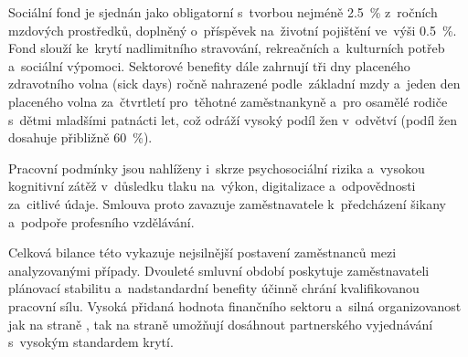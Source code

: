 Sociální fond je sjednán jako obligatorní s~tvorbou nejméně \SI{2,5}{\percent} z~ročních mzdových prostředků, doplněný o~příspěvek na~životní pojištění ve~výši \SI{0,5}{\percent}. Fond slouží ke~krytí nadlimitního stravování, rekreačních a~kulturních potřeb a~sociální výpomoci. Sektorové benefity dále zahrnují tři dny placeného zdravotního volna (sick days) ročně nahrazené podle~základní mzdy a~jeden den placeného volna za~čtvrtletí pro~těhotné zaměstnankyně a~pro osamělé rodiče s~dětmi mladšími patnácti let, což odráží vysoký podíl žen v~odvětví (podíl žen dosahuje přibližně \SI{60}{\percent}).\par

Pracovní podmínky jsou nahlíženy i~skrze psychosociální rizika a~vysokou kognitivní zátěž v~důsledku tlaku na~výkon, digitalizace a~odpovědnosti za~citlivé údaje. Smlouva proto zavazuje zaměstnavatele k~předcházení šikany a~podpoře profesního vzdělávání.\par

Celková bilance této  vykazuje nejsilnější postavení zaměstnanců mezi analyzovanými případy. Dvouleté smluvní období poskytuje zaměstnavateli plánovací stabilitu a~nadstandardní benefity účinně chrání kvalifikovanou pracovní sílu. Vysoká přidaná hodnota finančního sektoru a~silná organizovanost jak na straně , tak na straně  umožňují dosáhnout partnerského vyjednávání s~vysokým standardem krytí.~\cite{KSVS_OSPPP_2026}~\cite{CMKOS_ZpravaKV2025}\par
